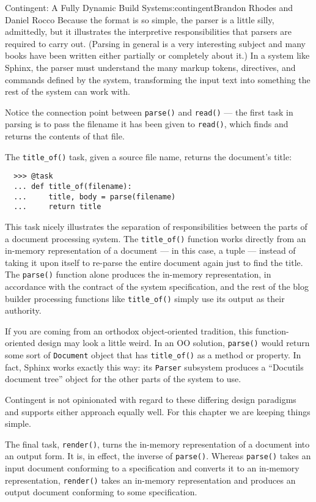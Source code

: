 \begin{aosachapter}{Contingent: A Fully Dynamic Build System}{s:contingent}{Brandon Rhodes and Daniel Rocco}
Because the format is so simple, the parser is a little silly,
admittedly, but it illustrates the interpretive responsibilities that
parsers are required to carry out. (Parsing in general is a very
interesting subject and many books have been written either partially or
completely about it.) In a system like Sphinx, the parser must
understand the many markup tokens, directives, and commands defined by
the system, transforming the input text into something the rest of the
system can work with.

Notice the connection point between \texttt{parse()} and \texttt{read()}
--- the first task in parsing is to pass the filename it has been given
to \texttt{read()}, which finds and returns the contents of that file.

The \texttt{title\_of()} task, given a source file name, returns the
document's title:

\begin{verbatim}
  >>> @task
  ... def title_of(filename):
  ...     title, body = parse(filename)
  ...     return title
\end{verbatim}

This task nicely illustrates the separation of responsibilities between
the parts of a document processing system. The \texttt{title\_of()}
function works directly from an in-memory representation of a document
--- in this case, a tuple --- instead of taking it upon itself to
re-parse the entire document again just to find the title. The
\texttt{parse()} function alone produces the in-memory representation,
in accordance with the contract of the system specification, and the
rest of the blog builder processing functions like \texttt{title\_of()}
simply use its output as their authority.

If you are coming from an orthodox object-oriented tradition, this
function-oriented design may look a little weird. In an OO solution,
\texttt{parse()} would return some sort of \texttt{Document} object that
has \texttt{title\_of()} as a method or property. In fact, Sphinx works
exactly this way: its \texttt{Parser} subsystem produces a ``Docutils
document tree'' object for the other parts of the system to use.

Contingent is not opinionated with regard to these differing design
paradigms and supports either approach equally well. For this chapter we
are keeping things simple.

The final task, \texttt{render()}, turns the in-memory representation of
a document into an output form. It is, in effect, the inverse of
\texttt{parse()}. Whereas \texttt{parse()} takes an input document
conforming to a specification and converts it to an in-memory
representation, \texttt{render()} takes an in-memory representation and
produces an output document conforming to some specification.


\end{aosachapter}
